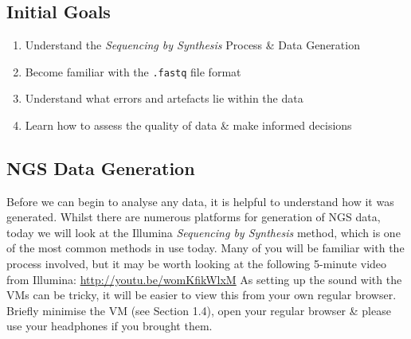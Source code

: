 
\chapter{\moduleTitle}
\newpage

\section{Initial Goals}

\begin{enumerate}
\item Understand the \textit{Sequencing by Synthesis} Process \& Data Generation \\
\item Become familiar with the \texttt{.fastq} file format\\
\item Understand what errors and artefacts lie within the data \\
\item Learn how to assess the quality of data \& make informed decisions \\
\end{enumerate}

\section{NGS Data Generation}
\begin{steps}
Before we can begin to analyse any data, it is helpful to understand how it was generated.
Whilst there are numerous platforms for generation of NGS data, today we will look at the Illumina \textit{Sequencing by Synthesis} method, which is one of the most common methods in use today.
Many of you will be familiar with the process involved, but it may be worth looking at the following 5-minute video from Illumina: \url{http://youtu.be/womKfikWlxM} 
As setting up the sound with the VMs can be tricky, it will be easier to view this from your own regular browser.
Briefly minimise the VM (see Section 1.4), open your regular browser \& please use your headphones if you brought them. \\
\end{steps}

